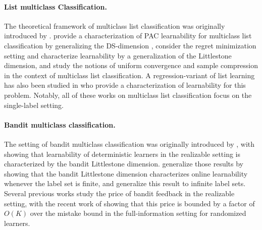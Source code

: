 \documentclass[11pt]{article}
\theoremstyle{plain}
\begin{document}
\paragraph{List multiclass Classification.} The theoretical framework of multiclass list classification was originally introduced by \cite{brukhim2022characterization}. \cite{charikar2023characterization} provide a characterization of PAC learnability for multiclass list classification by generalizing the DS-dimension \citep{daniely2014optimal}, \cite{moran2023list} consider the regret minimization setting and characterize learnability by a generalization of the Littlestone dimension, and \cite{hanneke2024list} study the notions of uniform convergence and sample compression in the context of multiclass list classification. A regression-variant of list learning has also been studied in \cite{pabbaraju2024characterization} who provide a characterization of learnability for this problem. Notably, all of these works on multiclass list classification focus on the single-label setting.

\paragraph{Bandit multiclass classification.} The setting of bandit multiclass classification was originally introduced by \cite{kakade2008efficient}, with \cite{daniely2011multiclass} showing that learnability of deterministic learners in the realizable setting is characterized by the bandit Littlestone dimension. \cite{daniely2013price} generalize those results by showing that the bandit Littlestone dimension characterizes online learnability whenever the label set is finite, and \cite{raman2023multiclass} generalize this result to infinite label sets. Several previous works \citep{auer1999structural,daniely2011multiclass,long2017new} study the price of bandit feedback in the realizable setting, with the recent work of \cite{filmus2024bandit} showing that this price is bounded by a factor of $O(K)$ over the mistake bound in the full-information setting for randomized learners.
\end{document}
